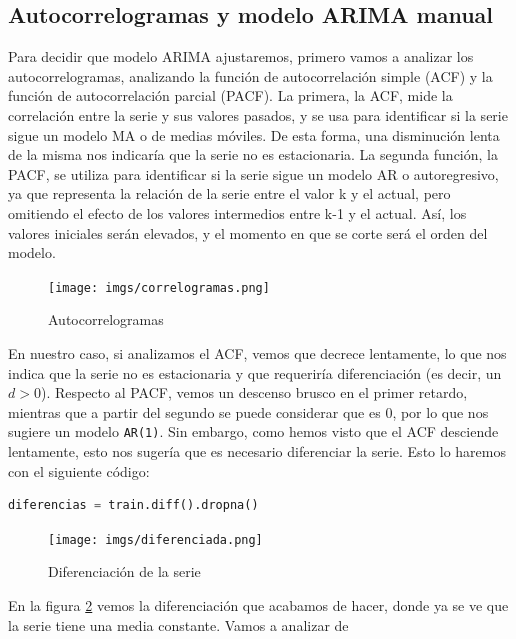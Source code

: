 \documentclass[a4paper,onecolumn]{extarticle}
\begin{document}
\begin{sloppypar}
\subsection{Autocorrelogramas y modelo ARIMA manual}\label{ARIMAman}
Para decidir que modelo ARIMA ajustaremos, primero vamos a analizar los autocorrelogramas, analizando la función de autocorrelación simple (ACF) y la función 
de autocorrelación parcial (PACF). La primera, la ACF, mide la correlación entre la serie y sus valores pasados, y se usa para identificar si la serie sigue un  
modelo MA o de medias móviles. De esta forma, una disminución lenta de la misma nos indicaría que la serie no es estacionaria. La segunda función, la PACF, se 
utiliza para identificar si la serie sigue un modelo AR o autoregresivo, ya que representa la relación de la serie entre el valor k y el actual, pero omitiendo 
el efecto de los valores intermedios entre k-1 y el actual. Así, los valores iniciales serán elevados, y el momento en que se corte será el orden del modelo.
\begin{center}
    \begin{figure}[h!]
        \centering
        \texttt{[image: imgs/correlogramas.png]}
        \caption{Autocorrelogramas} \label{fig:autocorrelogramas}
    \end{figure}
\end{center}
En nuestro caso, si analizamos el ACF, vemos que decrece lentamente, lo que nos indica que la serie no es estacionaria y que requeriría diferenciación (es decir, 
un $d>0$). Respecto al PACF, vemos un descenso brusco en el primer retardo, mientras que a partir del segundo se puede considerar que es 0, por lo que nos sugiere
un modelo \texttt{AR(1)}. Sin embargo, como hemos visto que el ACF desciende lentamente, esto nos sugería que es necesario diferenciar la serie. Esto lo haremos
con el siguiente código:
\begin{lstlisting}[language=Python]
    diferencias = train.diff().dropna()
\end{lstlisting}
\begin{center}
    \begin{figure}[h!]
        \centering
        \texttt{[image: imgs/diferenciada.png]}
        \caption{Diferenciación de la serie} \label{fig:diferenciacion}
    \end{figure}
\end{center}
En la figura \ref{fig:diferenciacion} vemos la diferenciación que acabamos de hacer, donde ya se ve que la serie tiene una media constante. Vamos a analizar de 

\end{sloppypar}
\end{document}
